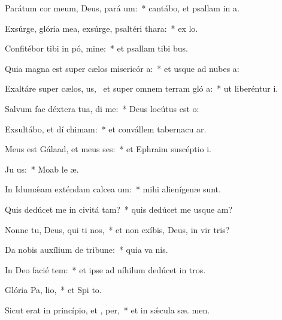 \item Parátum cor meum, Deus, pará  um:~* cantábo, et psallam in  a.
\item Exsúrge, glória mea, exsúrge, psaltéri  thara:~* ex lo.
\item Confitébor tibi in pó, mine:~* et psallam tibi  bus.
\item Quia magna est super cælos misericór a:~* et usque ad nubes  a:
\item Exaltáre super cælos, us,~\pscross{} et super omnem terram gló a:~* ut liberéntur  i.
\item Salvum fac déxtera tua,  di me:~* Deus locútus est   o:
\item Exsultábo, et dí chimam:~* et convállem tabernacu ar.
\item Meus est Gálaad, et meus  ses:~* et Ephraim suscéptio  i.
\item Ju  us:~* Moab le  æ.
\item In Idumǽam exténdam calcea um:~* mihi alienígenæ   sunt.
\item Quis dedúcet me in civitá tam?~* quis dedúcet me usque  am?
\item Nonne tu, Deus, qui ti nos,~* et non exíbis, Deus, in vir tris?
\item Da nobis auxílium de tribune:~* quia va  nis.
\item In Deo facié tem:~* et ipse ad níhilum dedúcet in tros.
\item Glória Pa,  lio,~* et Spi to.
\item Sicut erat in princípio, et ,  per,~* et in sǽcula sæ. men.
